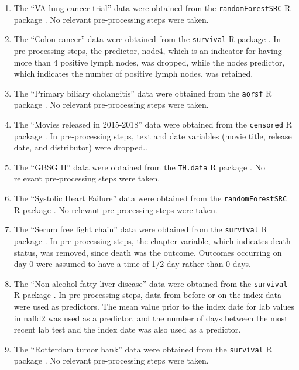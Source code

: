 \documentclass[12pt]{article}\usepackage[]{graphicx}\usepackage[]{xcolor}
\begin{document}
\begin{enumerate}

 \item The ``VA lung cancer trial'' data \citep{kalbfleisch2011statistical} were obtained from the \texttt{randomForestSRC} R package \citep{randomForestSRC}. No relevant pre-processing steps were taken. 
 \item The ``Colon cancer'' data \citep{moertel1995fluorouracil} were obtained from the \texttt{survival} R package \citep{survival}. In pre-processing steps, the predictor, node4, which is an indicator for having more than 4 positive lymph nodes, was dropped, while the nodes predictor, which indicates the number of positive lymph nodes, was retained. 
 \item The ``Primary biliary cholangitis'' data \citep{therneau2000cox} were obtained from the \texttt{aorsf} R package \citep{aorsf}. No relevant pre-processing steps were taken. 
 \item The ``Movies released in 2015-2018'' data  were obtained from the \texttt{censored} R package \citep{censored}. In pre-processing steps, text and date variables (movie title, release date, and distributor) were dropped.. 
 \item The ``GBSG II'' data \citep{schumacher1994rauschecker} were obtained from the \texttt{TH.data} R package \citep{TH.data}. No relevant pre-processing steps were taken. 
 \item The ``Systolic Heart Failure'' data \citep{hsich2011identifying} were obtained from the \texttt{randomForestSRC} R package \citep{randomForestSRC}. No relevant pre-processing steps were taken. 
 \item The ``Serum free light chain'' data \citep{dispenzieri2012use, kyle2006prevalence} were obtained from the \texttt{survival} R package \citep{survival}. In pre-processing steps, the chapter variable, which indicates death status, was removed, since death was the outcome. Outcomes occurring on day 0 were assumed to have a time of 1/2 day rather than 0 days. 
 \item The ``Non-alcohol fatty liver disease'' data \citep{allen2018nonalcoholic} were obtained from the \texttt{survival} R package \citep{survival}. In pre-processing steps, data from before or on the index data were used as predictors. The mean value prior to the index date for lab values in nafld2 was used as a predictor, and the number of days between the most recent lab test and the index date was also used as a predictor. 
 \item The ``Rotterdam tumor bank'' data \citep{royston2013external} were obtained from the \texttt{survival} R package \citep{survival}. No relevant pre-processing steps were taken. 

\end{enumerate}
\end{document}
